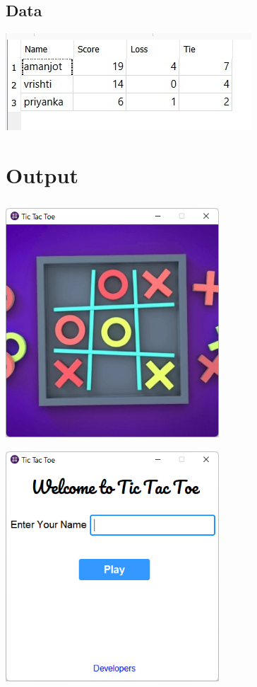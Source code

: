 \subsection{Data}
\hspace{14pt}
\includegraphics[]{figures/sql_data.png}

\section{Output}
\hspace{14pt}
\includegraphics[width=8cm, height=9cm]{figures/splash_page.png}
\hfill
\includegraphics[width=8cm, height=9cm]{figures/first_screen.png}

